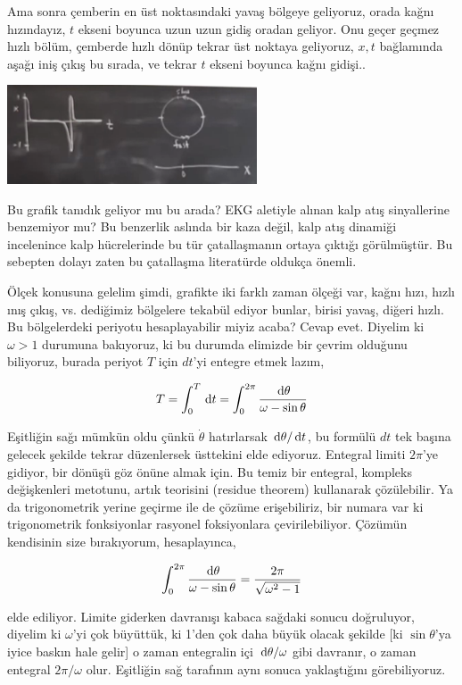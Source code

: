 \documentclass[12pt,fleqn]{article}\usepackage{../../common}
\begin{document}
Ama sonra çemberin en üst noktasındaki yavaş bölgeye geliyoruz, orada kağnı
hızındayız, $t$ ekseni boyunca uzun uzun gidiş oradan geliyor. Onu geçer
geçmez hızlı bölüm, çemberde hızlı dönüp tekrar üst noktaya geliyoruz,
$x,t$ bağlamında aşağı iniş çıkış bu sırada, ve tekrar $t$ ekseni boyunca
kağnı gidişi.. 

\includegraphics[width=20em]{14_19.png}

Bu grafik tanıdık geliyor mu bu arada? EKG aletiyle alınan kalp atış
sinyallerine benzemiyor mu? Bu benzerlik aslında bir kaza değil, kalp atış
dinamiği incelenince kalp hücrelerinde bu tür çatallaşmanın ortaya çıktığı
görülmüştür. Bu sebepten dolayı zaten bu çatallaşma literatürde oldukça
önemli. 

Ölçek konusuna gelelim şimdi, grafikte iki farklı zaman ölçeği var, kağnı
hızı, hızlı ınış çıkış, vs. dediğimiz bölgelere tekabül ediyor bunlar,
birisi yavaş, diğeri hızlı. Bu bölgelerdeki periyotu hesaplayabilir miyiz
acaba? Cevap evet. Diyelim ki $\omega > 1$ durumuna bakıyoruz, ki bu
durumda elimizde bir çevrim olduğunu biliyoruz, burada periyot $T$ için
$dt$'yi entegre etmek lazım,

$$ 
T = \int_{0}^{T} \,\mathrm{d} t = 
\int_{0}^{2\pi} \frac{\,\mathrm{d} \theta}{\omega - \sin\theta}
$$

Eşitliğin sağı mümkün oldu çünkü $\dot{\theta}$ hatırlarsak
$\,\mathrm{d} \theta / \,\mathrm{d} t$, bu formülü $dt$ tek başına gelecek şekilde tekrar
düzenlersek üsttekini elde ediyoruz. Entegral limiti $2\pi$'ye gidiyor, bir
dönüşü göz önüne almak için. Bu temiz bir entegral, kompleks değişkenleri
metotunu, artık teorisini (residue theorem) kullanarak çözülebilir. Ya da
trigonometrik yerine geçirme ile de çözüme erişebiliriz, bir numara var ki
trigonometrik fonksiyonlar rasyonel foksiyonlara çevirilebiliyor. Çözümün
kendisinin size bırakıyorum, hesaplayınca,

$$ 
\int_{0}^{2\pi} \frac{\,\mathrm{d} \theta}{\omega - \sin\theta} = 
\frac{2\pi}{\sqrt{\omega^2 - 1}}
$$

elde ediliyor. Limite giderken davranışı kabaca sağdaki sonucu doğruluyor,
diyelim ki $\omega$'yi çok büyüttük, ki 1'den çok daha büyük olacak şekilde
[ki $\sin\theta$'ya iyice baskın hale gelir] o zaman entegralin içi
$\,\mathrm{d} \theta / \omega$ gibi davranır, o zaman entegral $2\pi / \omega$
olur. Eşitliğin sağ tarafının aynı sonuca yaklaştığını görebiliyoruz.
\end{document}

